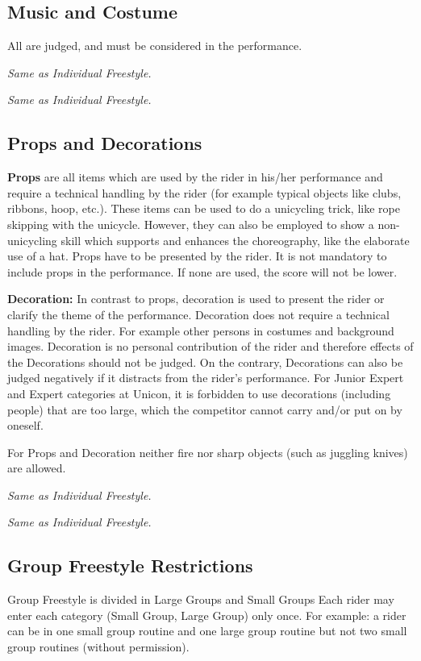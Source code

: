 \subsection{Music and Costume}
All are judged, and must be considered in the performance.

\textit{Same as Individual Freestyle.}

\textit{Same as Individual Freestyle.}

\subsection{Props and Decorations \label{subsec:freestyle_freestyle-rules_individual-freestyle-overview_props-and-decorations}}

\textbf{Props} are all items which are used by the rider in his/her performance and require a technical handling by the rider (for example typical objects like clubs, ribbons, hoop, etc.). 
These items can be used to do a unicycling trick, like rope skipping with the unicycle.
However, they can also be employed to show a non-unicycling skill which supports and enhances the choreography, like the elaborate use of a hat.
Props have to be presented by the rider.
It is not mandatory to include props in the performance.
If none are used, the score will not be lower. 

\textbf{Decoration:} In contrast to props, decoration is used to present the rider or clarify the theme of the performance.
Decoration does not require a technical handling by the rider.
For example other persons in costumes and background images.
Decoration is no personal contribution of the rider and therefore effects of the Decorations should not be judged.
On the contrary, Decorations can also be judged negatively if it distracts from the rider’s performance.
For Junior Expert and Expert categories at Unicon, it is forbidden to use decorations (including people) that are too large, which the competitor cannot carry and/or put on by oneself. 

For Props and Decoration neither fire nor sharp objects (such as juggling knives) are allowed.

\textit{Same as Individual Freestyle.}

\textit{Same as Individual Freestyle.}

\subsection{Group Freestyle Restrictions}
Group Freestyle is divided in Large Groups and Small Groups 
Each rider may enter each category (Small Group, Large Group) only once. For example: a rider can be in one small group routine and one large group routine but not two small group routines (without permission).

